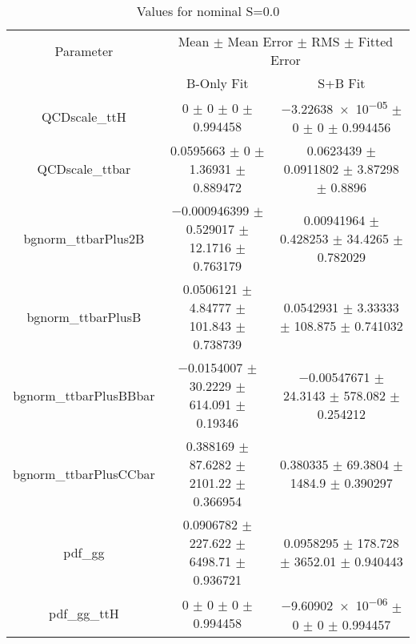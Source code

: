 \begin{table}
\centering
\caption{Values for nominal S=0.0}
\begin{tabular}{ccc}
\toprule
Parameter & \multicolumn{2}{c}{Mean $\pm$ Mean Error $\pm$ RMS $\pm$ Fitted Error}\\
 & B-Only Fit & S+B Fit\\
\midrule
QCDscale\_ttH & \num{0} $\pm$ \num{0} $\pm$ \num{0} $\pm$ \num{0.994458} & \num{-3.22638e-05} $\pm$ \num{0} $\pm$ \num{0} $\pm$ \num{0.994456}\\
QCDscale\_ttbar & \num{0.0595663} $\pm$ \num{0} $\pm$ \num{1.36931} $\pm$ \num{0.889472} & \num{0.0623439} $\pm$ \num{0.0911802} $\pm$ \num{3.87298} $\pm$ \num{0.8896}\\
bgnorm\_ttbarPlus2B & \num{-0.000946399} $\pm$ \num{0.529017} $\pm$ \num{12.1716} $\pm$ \num{0.763179} & \num{0.00941964} $\pm$ \num{0.428253} $\pm$ \num{34.4265} $\pm$ \num{0.782029}\\
bgnorm\_ttbarPlusB & \num{0.0506121} $\pm$ \num{4.84777} $\pm$ \num{101.843} $\pm$ \num{0.738739} & \num{0.0542931} $\pm$ \num{3.33333} $\pm$ \num{108.875} $\pm$ \num{0.741032}\\
bgnorm\_ttbarPlusBBbar & \num{-0.0154007} $\pm$ \num{30.2229} $\pm$ \num{614.091} $\pm$ \num{0.19346} & \num{-0.00547671} $\pm$ \num{24.3143} $\pm$ \num{578.082} $\pm$ \num{0.254212}\\
bgnorm\_ttbarPlusCCbar & \num{0.388169} $\pm$ \num{87.6282} $\pm$ \num{2101.22} $\pm$ \num{0.366954} & \num{0.380335} $\pm$ \num{69.3804} $\pm$ \num{1484.9} $\pm$ \num{0.390297}\\
pdf\_gg & \num{0.0906782} $\pm$ \num{227.622} $\pm$ \num{6498.71} $\pm$ \num{0.936721} & \num{0.0958295} $\pm$ \num{178.728} $\pm$ \num{3652.01} $\pm$ \num{0.940443}\\
pdf\_gg\_ttH & \num{0} $\pm$ \num{0} $\pm$ \num{0} $\pm$ \num{0.994458} & \num{-9.60902e-06} $\pm$ \num{0} $\pm$ \num{0} $\pm$ \num{0.994457}\\
\bottomrule
\end{tabular}
\end{table}